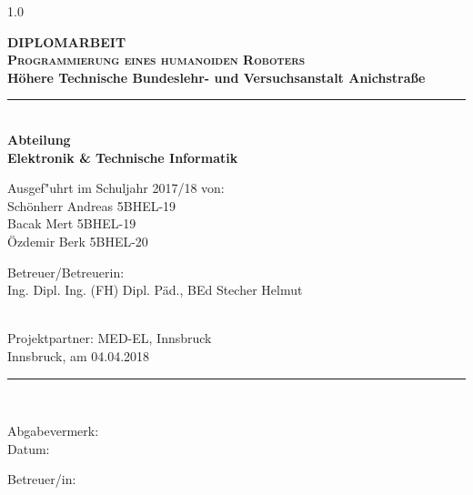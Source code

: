 \documentclass[12pt]{article}  %
\begin{document}
\pagestyle{fancy}
\fancyhf{}

\renewcommand{\sectionmark}[1]{\markright{#1}}
\renewcommand{\subsectionmark}[1]{\markright{#1}}
\renewcommand{\subsubsectionmark}[1]{\markright{#1}}
\lhead{}
\chead{}
\rhead{}
\cfoot{\thesection-\rightmark}
\rfoot[\thepage]{\thepage/\pageref{LastPage}}
\setlength{\headwidth}	{1.0\textwidth}
\setlength{\headheight}{6mm}
\renewcommand{\headrulewidth}{0.0pt}
\renewcommand{\footrulewidth}{0.33pt}


\begin{titlepage}
 \begin{center}
   \begin{minipage}{\linewidth}
   \begin{center}
	\vspace*{-14mm}
	{\fontsize{25pt}{25pt}\selectfont\bf DIPLOMARBEIT}
	\\[19mm]{\fontsize{20pt}{20pt}\selectfont\textbf{\textsc{Programmierung eines humanoiden Roboters}}}
	\\[15mm]{\fontsize{12.4pt}{12.4pt}\selectfont\bf
		Höhere Technische Bundeslehr- und Versuchsanstalt Anichstraße}
	\\[ 5mm]\rule{132mm}{1.0pt}
	\\[ 4mm]{\fontsize{12.4pt}{12.4pt}\selectfont\bf Abteilung}
	\\[ 5mm]{\fontsize{12.4pt}{12.4pt}\selectfont\bf Elektronik \& Technische Informatik}
	\\[24mm]{\hspace*{2mm}\parbox{154mm}{\fontsize{12.4pt}{12.4pt}\selectfont
	  \parbox[t]{75mm}{
		Ausgef"uhrt im Schuljahr 2017/18 von:
		\\[5.0mm]Schönherr Andreas 5BHEL-19
		\\[2.5mm]Bacak Mert 5BHEL-19
		\\[2.5mm]Özdemir Berk 5BHEL-20
	  }
	  \hspace*{6mm}
	  \parbox[t]{50mm}{
		Betreuer/Betreuerin:
		\\[5.0mm]Ing. Dipl. Ing. (FH) Dipl. Päd., BEd Stecher Helmut
	  }
	  \\[14.5mm]{Projektpartner: MED-EL, Innsbruck}
	  \\[14mm]{Innsbruck, am 04.04.2018}
	  \\[16mm]\rule{150mm}{0.5pt}
	  \\[ 8mm]
	  \parbox[t]{75mm}{
		Abgabevermerk:
		\\[3.25mm]Datum:
	  }
	  \hspace*{6mm}
	  \parbox[t]{50mm}{
		Betreuer/in:
	  }
	}}
   \end{center}\hfill
   \end{minipage}
 \end{center}
\end{titlepage}
\end{document}
